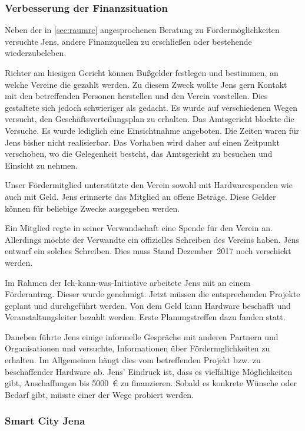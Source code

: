 \documentclass[ngerman]{scrartcl}
\begin{document}
\subsubsection{Verbesserung der Finanzsituation}

Neben der in \autoref{sec:raumrc} angesprochenen Beratung zu Fördermöglichkeiten
versuchte Jens, andere Finanzquellen zu erschließen oder bestehende
wiederzubeleben.

Richter am hiesigen Gericht können Bußgelder festlegen und bestimmen, an welche
Vereine die gezahlt werden. Zu diesem Zweck wollte Jens gern Kontakt mit den
betreffenden Personen herstellen und den Verein vorstellen. Dies gestaltete sich
jedoch schwieriger als gedacht. Es wurde auf verschiedenen Wegen versucht, den
Geschäftsverteilungsplan zu erhalten. Das Amtsgericht blockte die Versuche. Es
wurde lediglich eine Einsichtnahme angeboten. Die Zeiten waren für Jens bisher
nicht realisierbar. Das Vorhaben wird daher auf einen Zeitpunkt verschoben, wo
die Gelegenheit besteht, das Amtsgericht zu besuchen und Einsicht zu nehmen.

Unser Fördermitglied unterstützte den Verein sowohl mit Hardwarespenden wie auch
mit Geld. Jens erinnerte das Mitglied an offene Beträge. Diese Gelder können für
beliebige Zwecke ausgegeben werden.

Ein Mitglied regte in seiner Verwandschaft eine Spende für den Verein
an. Allerdings möchte der Verwandte ein offizielles Schreiben des Vereins
haben. Jens entwarf ein solches Schreiben. Dies muss Stand Dezember~2017 noch
verschickt werden.

Im Rahmen der Ich-kann-was-Initiative arbeitete Jens mit an einem
Förderantrag. Dieser wurde genehmigt. Jetzt müssen die entsprechenden Projekte
geplant und durchgeführt werden. Von dem Geld kann Hardware beschafft und
Veranstaltungsleiter bezahlt werden. Erste Planungstreffen dazu fanden statt.

Daneben führte Jens einige informelle Gespräche mit anderen Partnern und
Organisationen und versuchte, Informationen über Fördermglichkeiten zu
erhalten. Im Allgemeinen hängt dies vom betreffenden Projekt bzw. zu
beschaffender Hardware ab. Jens' Eindruck ist, dass es vielfältige Möglichkeiten
gibt, Anschaffungen bis \num{5000}~\euro{} zu finanzieren. Sobald es konkrete
Wünsche oder Bedarf gibt, müsste einer der Wege probiert werden.

\subsubsection{Smart City Jena}
\end{document}
